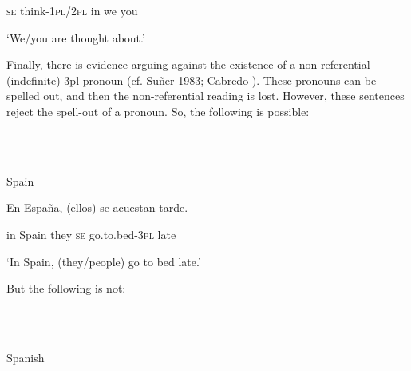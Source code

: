 \documentclass[output=paper]{langsci/langscibook}
\begin{document}
\begin{styleHTMLPreformatted}
  \textsc{se}   think-\textsc{1pl/2pl}     in    we            you
\end{styleHTMLPreformatted}

\begin{styleHTMLPreformatted}
          ‘We/you are thought about.’
\end{styleHTMLPreformatted}

\begin{styleHTMLPreformatted}
Finally, there is evidence arguing against the existence of a non-referential (indefinite) 3pl pronoun (cf. Suñer 1983; Cabredo \citealt{Hofherr2003}). These pronouns can be spelled out, and then the non-referential reading is lost. However, these sentences reject the spell-out of a pronoun. So, the following is possible:
\end{styleHTMLPreformatted}

\begin{styleHTMLPreformatted}
\ea%
    \label{ex:key:39}
    \gll\\
        \\
    \glt
    \z

           Spain
\end{styleHTMLPreformatted}

\begin{styleHTMLPreformatted}
En España, (ellos)  se  acuestan            tarde.    
\end{styleHTMLPreformatted}

\begin{styleHTMLPreformatted}
  in  Spain       they   \textsc{se} go.to.bed-\textsc{3pl}   late
\end{styleHTMLPreformatted}

\begin{styleHTMLPreformatted}
  ‘In Spain, (they/people) go to bed late.’
\end{styleHTMLPreformatted}

\begin{styleHTMLPreformatted}
But the following is not:
\end{styleHTMLPreformatted}

\begin{styleHTMLPreformatted}
\ea%
    \label{ex:key:40}
    \gll\\
        \\
    \glt
    \z

           Spanish
\end{styleHTMLPreformatted}
\end{document}

